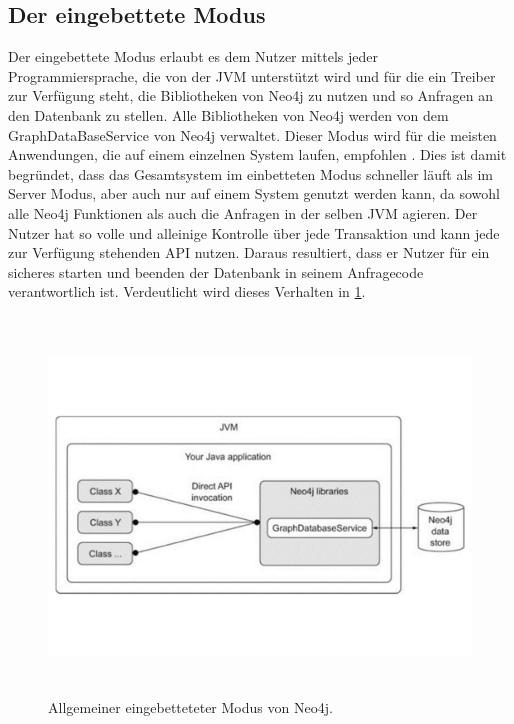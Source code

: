\subsection{Der eingebettete Modus}
Der eingebettete Modus erlaubt es dem Nutzer mittels jeder Programmiersprache, die von der JVM unterstützt wird und für die ein Treiber zur Verfügung steht, die Bibliotheken von Neo4j zu nutzen und so Anfragen an den Datenbank zu stellen. Alle Bibliotheken von Neo4j werden von dem GraphDataBaseService von Neo4j verwaltet. Dieser Modus wird für die meisten Anwendungen, die auf einem einzelnen System laufen, empfohlen \parencite{raj2015neo4j}. Dies ist damit begründet, dass das Gesamtsystem im einbetteten Modus schneller läuft als im Server Modus, aber auch nur auf einem System genutzt werden kann, da sowohl alle Neo4j Funktionen als auch die Anfragen in der selben JVM agieren. Der Nutzer hat so volle und alleinige Kontrolle über jede Transaktion und kann jede zur Verfügung stehenden  API nutzen. Daraus resultiert, dass er Nutzer für ein sicheres starten und beenden der Datenbank in seinem Anfragecode verantwortlich ist\parencite{robinson2013graph}.  Verdeutlicht wird dieses Verhalten in \ref{fig:Embedded}.
\begin{figure}[!htb]
	\centering
	\includegraphics [width=12cm, height=10cm]{Figures/Embedded}
	\caption[Eingebettet]{Allgemeiner eingebetteteter Modus von Neo4j.}
	\label{fig:Embedded}
	\FloatBarrier
\end{figure}

